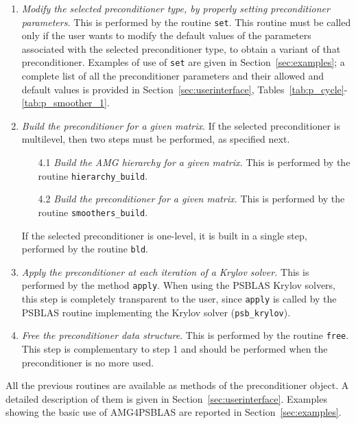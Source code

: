 \begin{enumerate}
\item \emph{Modify the selected preconditioner type, by properly setting
  preconditioner parameters.} This is performed by the routine \verb|set|.
  This routine must be called only if the user wants to modify the default values
  of the parameters associated with the selected preconditioner type, to obtain a variant
  of that preconditioner. Examples of use of \verb|set| are given in
  Section~\ref{sec:examples}; a complete list of all the
  preconditioner parameters and their allowed and default values is provided in
  Section~\ref{sec:userinterface}, Tables~\ref{tab:p_cycle}-\ref{tab:p_smoother_1}.
\item \emph{Build the preconditioner for a given matrix}. If the selected preconditioner
 is multilevel, then two steps must be performed, as specified next.
\begin{enumerate}
\item[4.1] \emph{Build the AMG hierarchy for a given matrix.} This is
performed by the routine \verb|hierarchy_build|.
\item[4.2] \emph{Build the preconditioner for a given matrix.} This is performed
by the routine \verb|smoothers_build|.
\end{enumerate}
 If the selected preconditioner is one-level, it is built in a single step,
performed by the routine \verb|bld|.
\item \emph{Apply the preconditioner at each iteration of a Krylov solver.}
  This is performed by the method \verb|apply|. When using the PSBLAS Krylov solvers,
  this step is completely transparent to the user, since \verb|apply| is called
  by the PSBLAS routine implementing the Krylov solver (\verb|psb_krylov|).
\item \emph{Free the preconditioner data structure}. This is performed by
  the routine \verb|free|. This step is complementary to step 1 and should
  be performed when the preconditioner is no more used.
\end{enumerate}

All the previous routines are available as methods of the preconditioner object.
A detailed description of them is given in Section~\ref{sec:userinterface}.
Examples showing the basic use of AMG4PSBLAS are reported in Section~\ref{sec:examples}.

